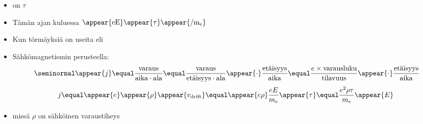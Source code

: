 \begin{frame}
\frametitle{\texorpdfstring{\culine[\sectiontitleulinecolor]{\sectiontitle}}{\sectiontitle} }
\appear{}

\begin{itemize}
	\item {} on $\tau$
	\item Tämän ajan kuluessa  $\appear{\mathrm{e} \mathrm{E}}  \appear{\tau} \appear{/ \mathrm{m}_{\mathrm{e}}}$

\item Kun törmäyksiä on useita eli  

\item Sähkömagnetismin perusteella:
$$ \seminormal
\appear{j} \equal \frac{\text {varaus}}{\text{aika} \cdot \text{ala}} \equal \frac{\text{varaus}}{\text {etäisyys} \cdot \text{ala}} \appear{\cdot} \frac{\text{etäisyys}}{\text {aika}}
 \equal \frac{e \times \text {varausluku}}{\text {tilavuus}} \appear{\cdot} \frac{\text{etäisyys}}{\text {aika}}
$$
\[
 j \equal \appear{e} \appear{\rho} \appear{v_{\text {drift}}}  \equal \appear{e \rho} \frac{e E}{m_{e}} \appear{\tau}  \equal \frac{e^{2} \rho \tau}{m_{e}} \appear{E}
\]
\item[] missä $\rho$ on sähköinen varaustiheys 
\end{itemize}

\endofslide 
\end{frame}

